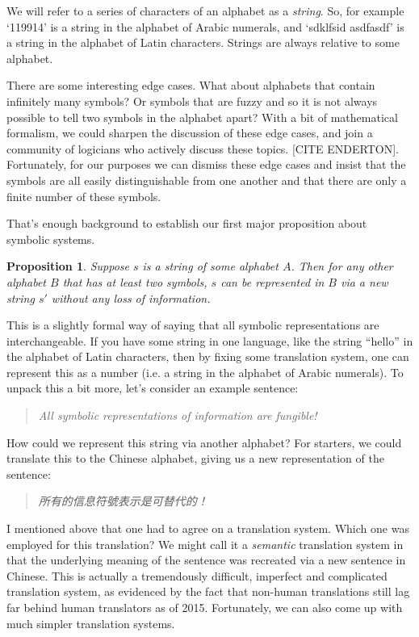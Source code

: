 \documentclass[UTF8]{book}
\newtheorem{theorem}{Proposition}
\begin{document}
\begin{CJK}{UTF8}{gbsn}
We will refer to a series of characters of an alphabet as a \emph{string}. So, for example `119914' is a string in the alphabet of Arabic numerals, and `sdklfsid asdfasdf' is a string in the alphabet of Latin characters. Strings are always relative to some alphabet.

There are some interesting edge cases. What about alphabets that contain infinitely many symbols? Or symbols that are fuzzy and so it is not always possible to tell two symbols in the alphabet apart? With a bit of mathematical formalism, we could sharpen the discussion of these edge cases, and join a community of logicians who actively discuss these topics. [CITE ENDERTON]. Fortunately, for our purposes we can dismiss these edge cases and insist that the symbols are all easily distinguishable from one another and that there are only a finite number of these symbols.

That's enough background to establish our first major proposition about symbolic systems.

\begin{theorem}
Suppose $s$ is a string of some alphabet $A$. Then for any other alphabet $B$ that has at least two symbols, $s$ can be represented in $B$ via a new string $s'$ without any loss of information.
\end{theorem}

This is a slightly formal way of saying that all symbolic representations are interchangeable. If you have some string in one language, like the string ``hello'' in the alphabet of Latin characters, then by fixing some translation system, one can represent this as a number (i.e. a string in the alphabet of Arabic numerals). To unpack this a bit more, let's consider an example sentence:

\begin{quotation}
\centering
\emph{All symbolic representations of information are fungible!}
\end{quotation}

How could we represent this string via another alphabet? For starters, we could translate this to the Chinese alphabet, giving us a new representation of the sentence:

\begin{quotation}
\centering
\emph{所有的信息符號表示是可替代的！}
\end{quotation}

I mentioned above that one had to agree on a translation system.  Which one was employed for this translation? We might call it a \emph{semantic} translation system in that the underlying meaning of the sentence was recreated via a new sentence in Chinese. This is actually a tremendously difficult, imperfect and complicated translation system, as evidenced by the fact that non-human translations still lag far behind human translators as of 2015. Fortunately, we can also come up with much simpler translation systems.


\end{CJK}
\end{document}
